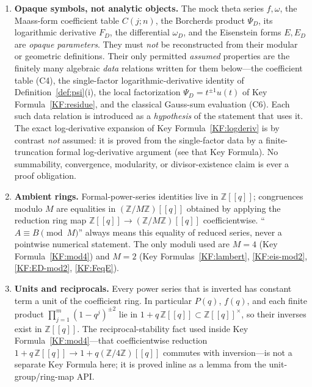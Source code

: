 \documentclass[11pt]{article}
\newcommand{\Z}{\mathbb{Z}}
\theoremstyle{definition}
\begin{document}
\begin{enumerate}
\item[(C1)] \textbf{Opaque symbols, not analytic objects.} The mock theta series $f,\omega$, the
Maass-form coefficient table $C(j;n)$, the Borcherds product $\Psi_D$, its logarithmic derivative
$F_D$, the differential $\omega_D$, and the Eisenstein forms $E,E_D$ are \emph{opaque parameters}.
They must \emph{not} be reconstructed from their modular or geometric definitions. Their only
permitted \emph{assumed} properties are the finitely many algebraic \emph{data} relations written
for them below---the coefficient table (C4), the single-factor logarithmic-derivative identity of
Definition~\ref{def:psi}(i), the local factorization $\Psi_D=t^{\pm1}u(t)$ of
Key Formula~\ref{KF:residue}, and the classical Gauss-sum evaluation (C6). Each such data relation
is introduced as a \emph{hypothesis} of the statement that uses it. The exact log-derivative
expansion of Key Formula~\ref{KF:logderiv} is by contrast \emph{not} assumed: it is proved from
the single-factor data by a finite-truncation formal log-derivative argument (see that Key
Formula). No summability, convergence, modularity, or divisor-existence claim is ever a proof
obligation.

\item[(C2)] \textbf{Ambient rings.} Formal-power-series identities live in $\Z[[q]]$; congruences
modulo $M$ are equalities in $(\Z/M\Z)[[q]]$ obtained by applying the reduction ring map
$\Z[[q]]\to(\Z/M\Z)[[q]]$ coefficientwise. ``$A\equiv B\pmod M$'' always means this equality of
reduced series, never a pointwise numerical statement. The only moduli used are $M=4$
(Key Formula~\ref{KF:mod4}) and $M=2$ (Key Formulas~\ref{KF:lambert}, \ref{KF:eis-mod2},
\ref{KF:ED-mod2}, \ref{KF:FeqE}).

\item[(C3)] \textbf{Units and reciprocals.} Every power series that is inverted has constant term
a unit of the coefficient ring. In particular $P(q)$, $f(q)$, and each finite product
$\prod_{j=1}^m(1-q^j)^{\pm2}$ lie in $1+q\,\Z[[q]]\subset\Z[[q]]^\times$, so their inverses exist
in $\Z[[q]]$. The reciprocal-stability fact used inside Key Formula~\ref{KF:mod4}---that
coefficientwise reduction $1+q\,\Z[[q]]\to 1+q(\Z/4\Z)[[q]]$ commutes with inversion---is not a
separate Key Formula here; it is proved inline as a lemma from the unit-group/ring-map API.


\end{enumerate}
\end{document}
